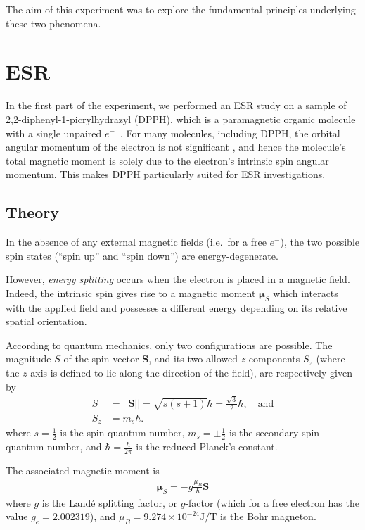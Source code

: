 \documentclass[a4paper]{jpconf}
\numberwithin{equation}{section}
\begin{document}
The aim of this experiment was to explore the fundamental principles underlying these two phenomena.

\section{ESR}
In the first part of the experiment, we performed an ESR study on a sample of 2,2-diphenyl-1-picrylhydrazyl (DPPH), which is a paramagnetic organic molecule with a single unpaired $e^-$~\cite{MacLaren}. For many molecules, including DPPH, the orbital angular momentum of the electron is not significant \cite{MacLaren},
and hence the molecule\textquoteright s total magnetic moment is solely due to the electron\textquoteright s intrinsic spin angular momentum. This makes DPPH particularly suited for ESR investigations.
 
\subsection{Theory}\label{section: theory}
In the absence of any external magnetic fields (i.e.\ for a free $e^-$), the two possible spin states (``spin up'' and ``spin down'') are energy-degenerate.

However, \emph{energy splitting} occurs when the electron is placed in a magnetic field. Indeed, the intrinsic spin gives rise to a magnetic moment $\bm{\mu}_S$ which interacts with the applied field and possesses a different energy depending on its relative spatial orientation. 

According to quantum mechanics, only two configurations are possible. The magnitude $S$ of the spin vector $\mathbf{S}$, and its two allowed $z$-components $S_z$ (where the $z$-axis is defined to lie along the direction of the field), are respectively given by
\begin{align}
	S &= \lvert\lvert\mathbf{S}\rvert\rvert = \sqrt{s(s+1)}\hbar = \tfrac{\sqrt{3}}{2}\hbar,  \quad \text{and} \nonumber \\
	S_z &= m_s \hbar. \label{eqn: magnetic moment z-projection}
\end{align}
where $s=\tfrac12$ is the spin quantum number, $m_s=\pm\tfrac12$ is the secondary spin quantum number, and $\hbar = \tfrac{h}{2 \pi}$ is the reduced Planck\textquoteright s constant.

The associated magnetic moment is
\begin{align}
	\bm{\mu}_S = - g \frac{\mu_B}{\hbar} \mathbf{S} \label{eqn: magnetic moment}
\end{align}
where $g$ is the Land\'e splitting factor, or $g$-factor (which for a free electron has the value $g_e = 2.002319$), and $\mu_B = 9.274 \times 10^{-24} \si{\joule\per\tesla}$ is the Bohr magneton. 
\end{document}
